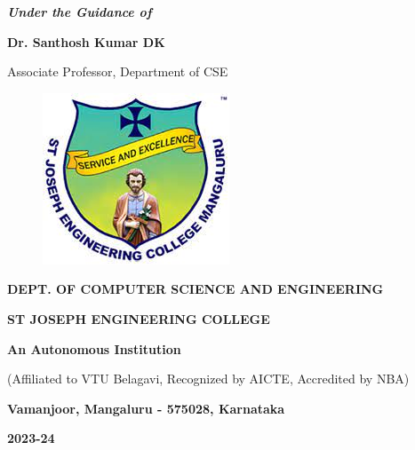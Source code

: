 \documentclass[12pt,a4paper]{report}
\begin{document}
\begin{center}
\vspace{12pt}
\textit{\textbf{Under the Guidance of}}
\par
\vspace{6pt}
\textbf{Dr. Santhosh Kumar DK}
\par
\vspace{2pt}
\normalsize {Associate Professor, Department of CSE}
\par
\begin{figure}[hbtp]
\centering
\includegraphics[scale=0.6]{./pic/sjeclogo}
\end{figure}
\large \textbf{DEPT. OF COMPUTER SCIENCE AND ENGINEERING}
\par \Large \textbf{ST JOSEPH ENGINEERING COLLEGE}
\par 
\textbf{An Autonomous Institution}
\par
{\large{(Affiliated to VTU Belagavi, Recognized by AICTE, Accredited by NBA)}}
\par
{\large \textbf{Vamanjoor, Mangaluru - 575028, Karnataka}}
\par 
{\Large \textbf{2023-24}}
\end{center}
\newpage
\end{document}
